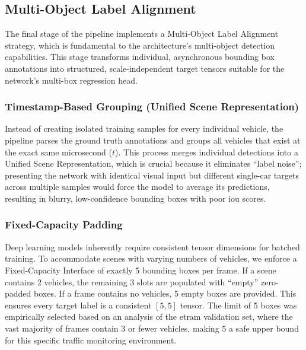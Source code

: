 \subsection{Multi-Object Label Alignment}
\label{subsec:multi_object_alignment}

The final stage of the pipeline implements a Multi-Object Label Alignment strategy, which is fundamental to the architecture's multi-object detection capabilities. 
This stage transforms individual, asynchronous bounding box annotations into structured, scale-independent target tensors suitable for the network's multi-box regression head.

\subsubsection{Timestamp-Based Grouping (Unified Scene Representation)}
Instead of creating isolated training samples for every individual vehicle, the pipeline parses the ground truth annotations and groups all vehicles that exist at the exact same microsecond ($t$). 
This process merges individual detections into a Unified Scene Representation, 
which is crucial because it eliminates ``label noise''; presenting the network with identical visual input but different single-car targets across multiple samples would force the model to average its predictions, resulting in blurry, low-confidence bounding boxes with poor \gls{iou} scores.

\subsubsection{Fixed-Capacity Padding}
Deep learning models inherently require consistent tensor dimensions for batched training. 
To accommodate scenes with varying numbers of vehicles, we enforce a Fixed-Capacity Interface of exactly 5 bounding boxes per frame. 
If a scene contains 2 vehicles, the remaining 3 slots are populated with ``empty'' zero-padded boxes. 
If a frame contains no vehicles, 5 empty boxes are provided. This ensures every target label is a consistent $[5, 5]$ tensor. 
The limit of 5 boxes was empirically selected based on an analysis of the \gls{etram} validation set, where the vast majority of frames contain 3 or fewer vehicles, making 5 a safe upper bound for this specific traffic monitoring environment.

